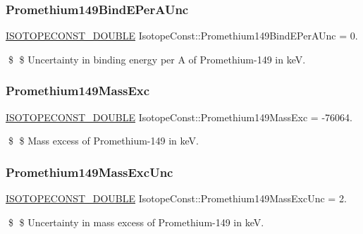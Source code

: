 \subsubsection{\texorpdfstring{Promethium149\+Bind\+E\+Per\+A\+Unc}{Promethium149BindEPerAUnc}}
{\footnotesize\ttfamily \mbox{\hyperlink{group___isotope_const-_macros_ga8f45a7272ce02c0b4c65c44636ed719a}{I\+S\+O\+T\+O\+P\+E\+C\+O\+N\+S\+T\+\_\+\+D\+O\+U\+B\+LE}} Isotope\+Const\+::\+Promethium149\+Bind\+E\+Per\+A\+Unc = 0.}

\$ \$ Uncertainty in binding energy per A of Promethium-\/149 in keV. \mbox{\label{group___isotope_const-_promethium-_pm149_ga17d4018d9b41543d7f7dd88088a62a83}} 
\subsubsection{\texorpdfstring{Promethium149\+Mass\+Exc}{Promethium149MassExc}}
{\footnotesize\ttfamily \mbox{\hyperlink{group___isotope_const-_macros_ga8f45a7272ce02c0b4c65c44636ed719a}{I\+S\+O\+T\+O\+P\+E\+C\+O\+N\+S\+T\+\_\+\+D\+O\+U\+B\+LE}} Isotope\+Const\+::\+Promethium149\+Mass\+Exc = -\/76064.}

\$ \$ Mass excess of Promethium-\/149 in keV. \mbox{\label{group___isotope_const-_promethium-_pm149_gab6a38fc8d5c5e60429a956f092506337}} 
\subsubsection{\texorpdfstring{Promethium149\+Mass\+Exc\+Unc}{Promethium149MassExcUnc}}
{\footnotesize\ttfamily \mbox{\hyperlink{group___isotope_const-_macros_ga8f45a7272ce02c0b4c65c44636ed719a}{I\+S\+O\+T\+O\+P\+E\+C\+O\+N\+S\+T\+\_\+\+D\+O\+U\+B\+LE}} Isotope\+Const\+::\+Promethium149\+Mass\+Exc\+Unc = 2.}

\$ \$ Uncertainty in mass excess of Promethium-\/149 in keV. \mbox{\label{group___isotope_const-_promethium-_pm149_gae76f5c32b0006911633c72265dbac170}} 
